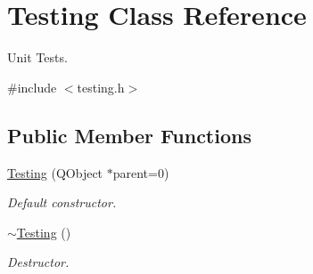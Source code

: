 \hypertarget{class_testing}{\section{\-Testing \-Class \-Reference}
\label{class_testing}
}


\-Unit \-Tests.  




{\ttfamily \#include $<$testing.\-h$>$}

\subsection*{\-Public \-Member \-Functions}
\begin{DoxyCompactItemize}
\item 
\hyperlink{class_testing_a7392c3ebb46b59f510453c22791ba788}{\-Testing} (\-Q\-Object $\ast$parent=0)
\begin{DoxyCompactList}\small\item\em \-Default constructor. \end{DoxyCompactList}\item 
\hyperlink{class_testing_ac21e3492d23395d194fe2fd8e2292e71}{$\sim$\-Testing} ()
\begin{DoxyCompactList}\small\item\em \-Destructor. \end{DoxyCompactList}\end{DoxyCompactItemize}
